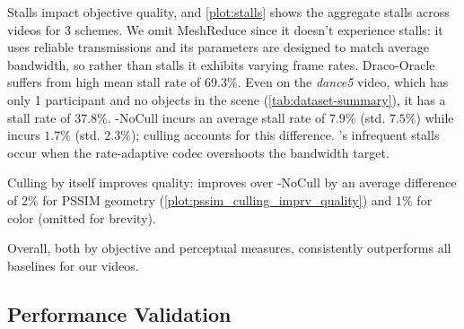 Stalls impact objective quality, and \cref{plot:stalls} shows the aggregate stalls across videos for 3 schemes.
%
We omit MeshReduce since it doesn't experience stalls: it uses reliable transmissions and its parameters are designed to match average bandwidth, so rather than stalls it exhibits varying frame rates.
%
Draco-Oracle suffers from high mean stall rate of $69.3\%$.
%
Even on the \textit{dance5} video, which has only 1 participant and no objects in the scene (\cref{tab:dataset-summary}), it has a stall rate of $37.8\%$.
%
%
\livo-NoCull incurs an average stall rate of $7.9\%$ (std. $7.5\%$) while \livo incurs $1.7\%$ (std. $2.3\%$); culling accounts for this difference.
%
\livo's infrequent stalls occur when the rate-adaptive codec overshoots the bandwidth target.

Culling by itself improves quality: \livo improves over \livo-NoCull by an average difference of $2\%$ for PSSIM geometry (\cref{plot:pssim_culling_imprv_quality}) and $1\%$ for color (omitted for brevity).

Overall, both by objective and perceptual measures, \livo{} consistently outperforms all baselines for our videos.

\subsection{Performance Validation}
\label{s:perf-valid}

